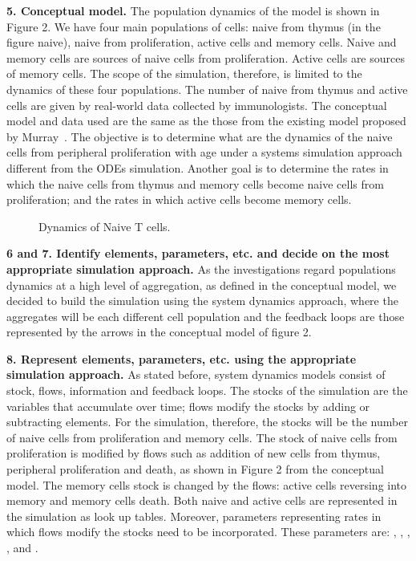 \documentclass{llncs}
\begin{document}
{\bf 5. Conceptual model.} The population dynamics of the model is shown in Figure 2. We have four main populations of cells: naive from thymus (in the figure naive), naive from proliferation, active cells and memory cells. Naive and memory cells are sources of naive cells from proliferation. Active cells are sources of memory cells. The scope of the simulation, therefore, is limited to the dynamics of these four populations. The number of naive from thymus and active cells are given by real-world data collected by immunologists. The conceptual model and data used are the same as the those from the existing model proposed by Murray~\cite{Murray:2003}. The objective is to determine what are the dynamics of the naive cells from peripheral proliferation with age under a systems simulation approach different from the ODEs simulation. Another goal is to determine the rates in which the naive cells from thymus and memory cells become naive cells from proliferation; and the rates in which active cells become memory cells.

\begin{figure}[!htpb]
\vspace{-20pt}
 \begin{center}
 \end{center}
 \label{fig:Conceptual}
 \vspace{-20pt}
 \caption{Dynamics of Naive T cells.}
 \vspace{-20pt}
\end{figure}

{\bf 6 and 7. Identify elements, parameters, etc. and decide on the most appropriate simulation approach.} As the investigations regard populations dynamics at a high level of aggregation, as defined in the conceptual model, we decided to build the simulation using the system dynamics approach, where the aggregates will be each different cell population and the feedback loops are those represented by the arrows in the conceptual model of figure 2.

{\bf 8. Represent elements, parameters, etc. using the appropriate simulation approach.} As stated before, system dynamics models consist of stock, flows, information and feedback loops. The stocks of the simulation are the variables that accumulate over time; flows modify the stocks by adding or subtracting elements. For the simulation, therefore, the stocks will be the number of naive cells from proliferation and memory cells. The stock of naive cells from proliferation is modified by flows such as addition of new cells from thymus, peripheral proliferation and death, as shown in Figure 2 from the conceptual model. The memory cells stock is changed by the flows: active cells reversing into memory and memory cells death. Both naive and active cells are represented in the simulation as look up tables. Moreover, parameters representing rates in which flows modify the stocks need to be incorporated. These parameters are: , , , ,  and .
\end{document}
